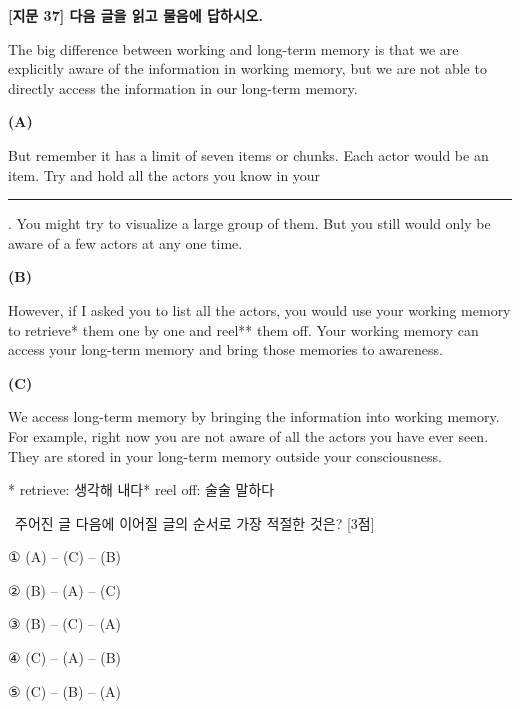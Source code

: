 \documentclass[11pt,a4paper]{article}
\newcommand{\qno}[1]{\par\vspace{8pt}\noindent{\sffamily\bfseries #1.}\ }
\newcommand{\instr}[1]{{\sffamily #1}\par\vspace{3pt}}
\begin{document}
\begin{center}
{\fontsize{15}{17}\selectfont\sffamily\bfseries [지문 37] 다음 글을 읽고 물음에 답하시오.}
\end{center}
\vspace{4pt}

\begin{pbox}
\hspace{1em}The big difference between working and long-term memory is that we are explicitly aware of the information in working memory, but we are not able to directly access the information in our long-term memory.

\vspace{6pt}
\noindent\textbf{(A)}

\hspace{1em}But remember it has a limit of seven items or chunks. Each actor would be an item. Try and hold all the actors you know in your \rule{4cm}{0.4pt}. You might try to visualize a large group of them. But you still would only be aware of a few actors at any one time.

\vspace{6pt}
\noindent\textbf{(B)}

\hspace{1em}However, if I asked you to list all the actors, you would use your working memory to retrieve* them one by one and reel** them off. Your working memory can access your long-term memory and bring those memories to awareness.

\vspace{6pt}
\noindent\textbf{(C)}

\hspace{1em}We access long-term memory by bringing the information into working memory. For example, right now you are not aware of all the actors you have ever seen. They are stored in your long-term memory outside your consciousness.

\vspace{6pt}
\noindent\footnotesize{* retrieve: 생각해 내다\quad ** reel off: 술술 말하다}
\end{pbox}

\qno{1}\instr{주어진 글 다음에 이어질 글의 순서로 가장 적절한 것은? [3점]}
\begin{choices}
\item ① (A) -- (C) -- (B)
\item ② (B) -- (A) -- (C)
\item ③ (B) -- (C) -- (A)
\item ④ (C) -- (A) -- (B)
\item ⑤ (C) -- (B) -- (A)
\end{choices}
\end{document}
